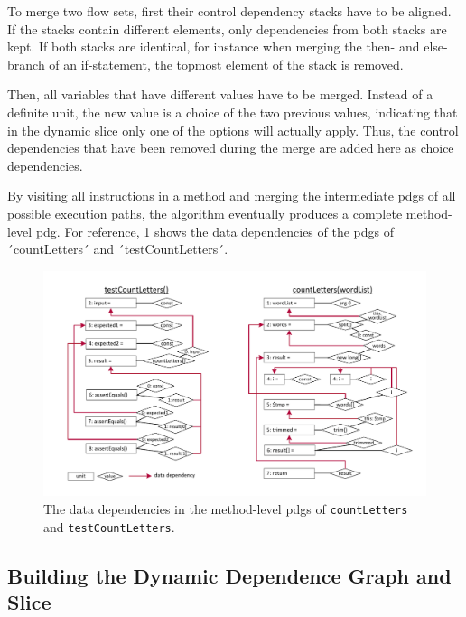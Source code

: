 To merge two flow sets, first their control dependency stacks have to be aligned.
If the stacks contain different elements, only dependencies from both stacks are kept.
If both stacks are identical, for instance when merging the then- and else-branch of an if-statement, the topmost element of the stack is removed.

Then, all variables that have different values have to be merged.
Instead of a definite unit, the new value is a choice of the two previous values, indicating that in the dynamic slice only one of the options will actually apply.
Thus, the control dependencies that have been removed during the merge are added here as choice dependencies.

By visiting all instructions in a method and merging the intermediate \acp{pdg} of all possible execution paths, the algorithm eventually produces a complete method-level \ac{pdg}.
For reference, \cref{fig:graph_static} shows the data dependencies of the \acp{pdg} of ´countLetters´ and ´testCountLetters´.

\begin{figure}[t]
\centering
\includegraphics[width=.90\linewidth, clip, trim=12mm 7mm 7mm 7mm]{img/graph_static}
\caption{The data dependencies in the method-level \aclp{pdg} of \lstinline+countLetters+ and \lstinline+testCountLetters+.}
\label{fig:graph_static}
\end{figure}

\subsection{Building the Dynamic Dependence Graph and Slice}




